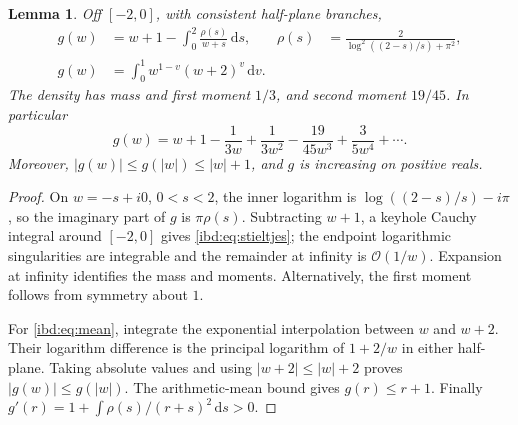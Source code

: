 \documentclass[11pt,letterpaper]{article}
\newtheorem{lemma}[theorem]{Lemma}
\theoremstyle{remark}\newtheorem{remark}[theorem]{Remark}
\newcommand{\dd}{\,\mathrm d}
\newcommand{\Oh}{\mathcal O}
\begin{document}
\begin{lemma}\label{ibd:lem:stieltjes}
Off $[-2,0]$, with consistent half-plane branches,
\begin{align}\label{ibd:eq:stieltjes}
 g(w)&=w+1-\int_0^2\frac{\rho(s)}{w+s}\dd s,
 &\rho(s)&=\frac2{\log^2((2-s)/s)+\pi^2},\\
 g(w)&=\int_0^1 w^{1-v}(w+2)^v\dd v.\label{ibd:eq:mean}
\end{align}
The density has mass and first moment $1/3$, and second moment $19/45$. In particular
\begin{equation}\label{ibd:eq:gexp}
 g(w)=w+1-\frac1{3w}+\frac1{3w^2}-\frac{19}{45w^3}+\frac3{5w^4}+\cdots.
\end{equation}
Moreover, $|g(w)|\leq g(|w|)\leq |w|+1$, and $g$ is increasing on positive reals.
\end{lemma}
\begin{proof}
On $w=-s+i0$, $0<s<2$, the inner logarithm is
$\log((2-s)/s)-i\pi$, so the imaginary part of $g$ is $\pi\rho(s)$. Subtracting $w+1$, a keyhole Cauchy integral around $[-2,0]$ gives \eqref{ibd:eq:stieltjes}; the endpoint logarithmic singularities are integrable and the remainder at infinity is $\Oh(1/w)$. Expansion at infinity identifies the mass and moments. Alternatively, the first moment follows from symmetry about $1$.

For \eqref{ibd:eq:mean}, integrate the exponential interpolation between $w$ and $w+2$. Their logarithm difference is the principal logarithm of $1+2/w$ in either half-plane. Taking absolute values and using $|w+2|\leq |w|+2$ proves $|g(w)|\leq g(|w|)$. The arithmetic-mean bound gives $g(r)\leq r+1$. Finally $g'(r)=1+\int\rho(s)/(r+s)^2\dd s>0$.
\end{proof}
\end{document}
